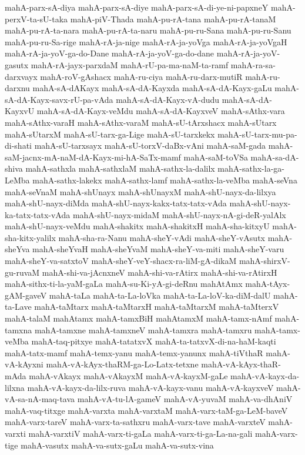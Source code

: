 {mahA-parx-sA-diya
mahA-parx-sA-diye
mahA-parx-sA-di-ye-ni-papxneY
mahA-perxV-ta-sU-taka
mahA-piV-Thada
mahA-pu-rA-tana
mahA-pu-rA-tanaM
mahA-pu-rA-ta-nara
mahA-pu-rA-ta-naru
mahA-pu-ru-Sana
mahA-pu-ru-Sanu
mahA-pu-ru-Sa-rige
mahA-rA-ja-nige
mahA-rA-ja-yoVga
mahA-rA-ja-yoVgaH
mahA-rA-ja-yoV-ga-do-Dane
mahA-rA-ja-yoV-ga-do-dane
mahA-rA-ja-yoV-gasutx
mahA-rA-jayx-parxdaM
mahA-rU-pa-ma-naM-ta-ramf
mahA-ra-sa-darxvayx
mahA-roV-gAshacx
mahA-ru-ciya
mahA-ru-darx-mutiR
mahA-ru-darxnu
mahA-sA-dAKayx
mahA-sA-dA-Kayxda
mahA-sA-dA-Kayx-gaLu
mahA-sA-dA-Kayx-savx-rU-pa-vAda
mahA-sA-dA-Kayx-vA-dudu
mahA-sA-dA-KayxvU
mahA-sA-dA-Kayx-veMdu
mahA-sA-dA-KayxveV
mahA-sAthx-vara
mahA-sAthx-varaH
mahA-sAthx-varaM
mahA-sU-tArxshacx
mahA-sUtarx
mahA-sUtarxM
mahA-sU-tarx-ga-Lige
mahA-sU-tarxkekx
mahA-sU-tarx-mu-pa-di-shati
mahA-sU-tarxsayx
mahA-sU-torxV-daBx-vAni
mahA-saM-gada
mahA-saM-jacnx-mA-naM-dA-Kayx-mi-hA-SaTx-mamf
mahA-saM-toVSa
mahA-sa-dA-shiva
mahA-sathxla
mahA-sathxlaM
mahA-sathx-la-dalilx
mahA-sathx-la-ga-LeMba
mahA-sathx-lakekx
mahA-sathx-lamf
mahA-sathx-la-veMba
mahA-seVna
mahA-seVnaM
mahA-shUnayx
mahA-shUnayxM
mahA-shU-nayx-da-lilxya
mahA-shU-nayx-diMda
mahA-shU-nayx-kakx-tatx-tatx-vAda
mahA-shU-nayx-ka-tatx-tatx-vAda
mahA-shU-nayx-midaM
mahA-shU-nayx-nA-gi-deR-yalAlx
mahA-shU-nayx-veMdu
mahA-shakitx
mahA-shakitxH
mahA-sha-kitxyU
mahA-sha-kitx-yalilx
mahA-sha-ra-Nanu
mahA-sheY-vAdi
mahA-sheY-vAsutx
mahA-sheYva
mahA-sheYvaH
mahA-sheYvaM
mahA-sheY-va-miti
mahA-sheY-varu
mahA-sheY-va-satxtoV
mahA-sheY-veY-shacx-ra-liM-gA-dikaM
mahA-shirxV-gu-ruvaM
mahA-shi-va-jAcnxneV
mahA-shi-va-rAtirx
mahA-shi-va-rAtirxH
mahA-sithx-ti-la-yaM-gaLa
mahA-su-Ki-yA-gi-deRnu
mahAtAmx
mahA-tAyx-gAM-gaveV
mahA-taLa
mahA-ta-La-loVka
mahA-ta-La-loV-ka-diM-dalU
mahA-ta-Lave
mahA-taMtarx
mahA-taMtarxH
mahA-taMtarxM
mahA-taMterxV
mahA-talaM
mahAtamx
mahA-tamxBiH
mahAtamxM
mahA-tamx-nAmf
mahA-tamxna
mahA-tamxne
mahA-tamxneV
mahA-tamxra
mahA-tamxru
mahA-tamx-veMba
mahA-taq-pitxye
mahA-tatatxvX
mahA-ta-tatxvX-di-na-haM-kaqti
mahA-tatx-mamf
mahA-temx-yanu
mahA-temx-yanunx
mahA-tiVthaR
mahA-vA-kAyxni
mahA-vA-kAyx-thaRM-ga-Lo-Latx-tetxne
mahA-vA-kAyx-thaR-mAda
mahA-vAkayx
mahA-vAkayxM
mahA-vA-kayxM-gaLe
mahA-vA-kayx-da-lilxna
mahA-vA-kayx-da-lilx-ruva
mahA-vA-kayx-vanu
mahA-vA-kayxveV
mahA-vA-sa-nA-maq-tava
mahA-vA-tu-lA-gameV
mahA-vA-yuvaM
mahA-va-dhAniV
mahA-vaq-titxge
mahA-varxta
mahA-varxtaM
mahA-varx-taM-ga-LeM-baveV
mahA-varx-tareV
mahA-varx-ta-sathxru
mahA-varx-tave
mahA-varxteV
mahA-varxti
mahA-varxtiV
mahA-varx-ti-gaLa
mahA-varx-ti-ga-La-na-gali
mahA-varx-tige
mahA-vasutx
mahA-va-sutx-gaLu
mahA-va-sutx-vina
}
